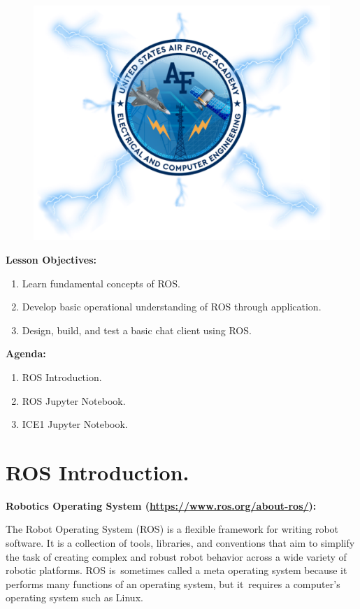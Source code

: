 \documentclass{handout}
\begin{document}
\maketitle

\begin{figure}[H]
	\centering
	\includegraphics[width=.75\textwidth]{Cover.PNG}
\end{figure}

\textbf{Lesson Objectives:}
\begin{enumerate} \setlength\itemsep{0em}
	\item Learn fundamental concepts of ROS.
	\item Develop basic operational understanding of ROS through application.
	\item Design, build, and test a basic chat client using ROS.
\end{enumerate}

\textbf{Agenda:}
\begin{enumerate} \setlength\itemsep{0em}
	\item ROS Introduction.
	\item ROS Jupyter Notebook.
	\item ICE1 Jupyter Notebook.
\end{enumerate}

\newpage
\clearpage
\pagebreak

\section{ROS Introduction.}
\textbf{Robotics Operating System (\url{https://www.ros.org/about-ros/}):}

The Robot Operating System (ROS) is a flexible framework for writing robot software. It is a collection of tools, libraries, and conventions that aim to simplify the task of creating complex and robust robot behavior across a wide variety of robotic platforms. ROS is sometimes called a meta operating system because it performs many functions of an operating system, but it requires a computer's operating system such as Linux. 	
\end{document}
